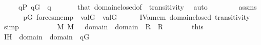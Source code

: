 \begin{isabellebody}
\ \ \ \ \ {\isachardoublequoteopen}q{\isasymin}P{\isachardoublequoteclose}\ {\isachardoublequoteopen}q{\isasymin}G{\isachardoublequoteclose}\ \ q\ {\isasymsigma}\isanewline
\ \ \ \ \isamarkupfalse%
\ that\ domain{\isacharunderscore}{\kern0pt}closed{\isacharbrackleft}{\kern0pt}of\ {\isasymtheta}{\isacharbrackright}{\kern0pt}\ transitivity\ \isamarkupfalse%
\ auto\isanewline
\ \ \isamarkupfalse%
\ \isanewline
\ \ \isamarkupfalse%
\ assms\isanewline
\ \ \isamarkupfalse%
\isanewline
\ \ \isamarkupfalse%
\ {\isachardoublequoteopen}{\isasymforall}p{\isasymin}G{\isachardot}{\kern0pt}\ forces{\isacharunderscore}{\kern0pt}mem{\isacharparenleft}{\kern0pt}p{\isacharcomma}{\kern0pt}{\isasymtau}{\isacharcomma}{\kern0pt}{\isasymtheta}{\isacharparenright}{\kern0pt}\ {\isasymlongrightarrow}\ val{\isacharparenleft}{\kern0pt}G{\isacharcomma}{\kern0pt}{\isasymtau}{\isacharparenright}{\kern0pt}\ {\isasymin}\ val{\isacharparenleft}{\kern0pt}G{\isacharcomma}{\kern0pt}{\isasymtheta}{\isacharparenright}{\kern0pt}{\isachardoublequoteclose}\isanewline
\ \ \ \ \isamarkupfalse%
\ IV{}{}{}a{\isacharunderscore}{\kern0pt}mem\ domain{\isacharunderscore}{\kern0pt}closed\ transitivity\ \isamarkupfalse%
\ {\isacharparenleft}{\kern0pt}simp{\isacharparenright}{\kern0pt}\isanewline
{}\isamarkupfalse%
\isanewline
\ \ \isamarkupfalse%
\ {\isasymtau}\ {\isasymtheta}\ \isanewline
\ \ \isamarkupfalse%
\ {\isachardoublequoteopen}{\isasymtau}{\isasymin}M{\isachardoublequoteclose}\ {\isachardoublequoteopen}{\isasymtheta}{\isasymin}M{\isachardoublequoteclose}\ {\isachardoublequoteopen}{\isasymsigma}\ {\isasymin}\ domain{\isacharparenleft}{\kern0pt}{\isasymtau}{\isacharparenright}{\kern0pt}\ {\isasymunion}\ domain{\isacharparenleft}{\kern0pt}{\isasymtheta}{\isacharparenright}{\kern0pt}\ {\isasymLongrightarrow}\ {\isacharquery}{\kern0pt}R{\isacharparenleft}{\kern0pt}{\isasymsigma}{\isacharcomma}{\kern0pt}{\isasymtau}{\isacharparenright}{\kern0pt}\ {\isasymand}\ {\isacharquery}{\kern0pt}R{\isacharparenleft}{\kern0pt}{\isasymsigma}{\isacharcomma}{\kern0pt}{\isasymtheta}{\isacharparenright}{\kern0pt}{\isachardoublequoteclose}\ \ {\isasymsigma}\isanewline
\ \ \isamarkupfalse%
\ \isamarkupfalse%
\ this\isanewline
\ \ \isamarkupfalse%
\ IH{\isacharprime}{\kern0pt}{\isacharcolon}{\kern0pt}{\isachardoublequoteopen}{\isasymsigma}\ {\isasymin}\ domain{\isacharparenleft}{\kern0pt}{\isasymtau}{\isacharparenright}{\kern0pt}\ {\isasymunion}\ domain{\isacharparenleft}{\kern0pt}{\isasymtheta}{\isacharparenright}{\kern0pt}\ {\isasymLongrightarrow}\ q{\isasymin}G\ {\isasymLongrightarrow}\isanewline

\end{isabellebody}
